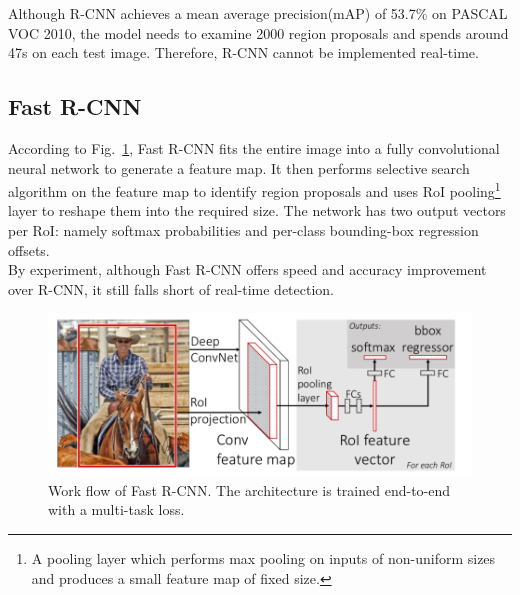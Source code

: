\documentclass[letterpaper]{article} %
\begin{document}
\noindent Although R-CNN achieves a mean average precision(mAP) of 53.7\% on PASCAL VOC 2010, the model needs to examine 2000 region proposals and spends around 47s on each test image. Therefore, R-CNN cannot be implemented real-time.

\subsection{Fast R-CNN}
According to Fig.~\ref{fig:fast_2}, Fast R-CNN fits the entire image into a fully convolutional neural network to generate a feature map. It then performs selective search algorithm on the feature map to identify region proposals and uses RoI pooling\footnote{A pooling layer which performs max pooling on inputs of non-uniform sizes and produces a small feature map of fixed size.} layer to reshape them into the required size. The network has two output vectors per RoI: namely softmax probabilities and per-class bounding-box regression offsets.\\

\noindent By experiment, although Fast R-CNN offers speed and accuracy improvement over R-CNN, it still falls short of real-time detection.
\begin{figure}[ht]
\hspace{0mm}
\centering
\includegraphics[scale=0.23]{Figure/fast_r_cnn.png}
\caption{\footnotesize{Work flow of Fast R-CNN. The architecture is trained end-to-end with a multi-task loss.}}
\label{fig:fast_2}
\vspace{-2mm}
\end{figure}

\end{document}
